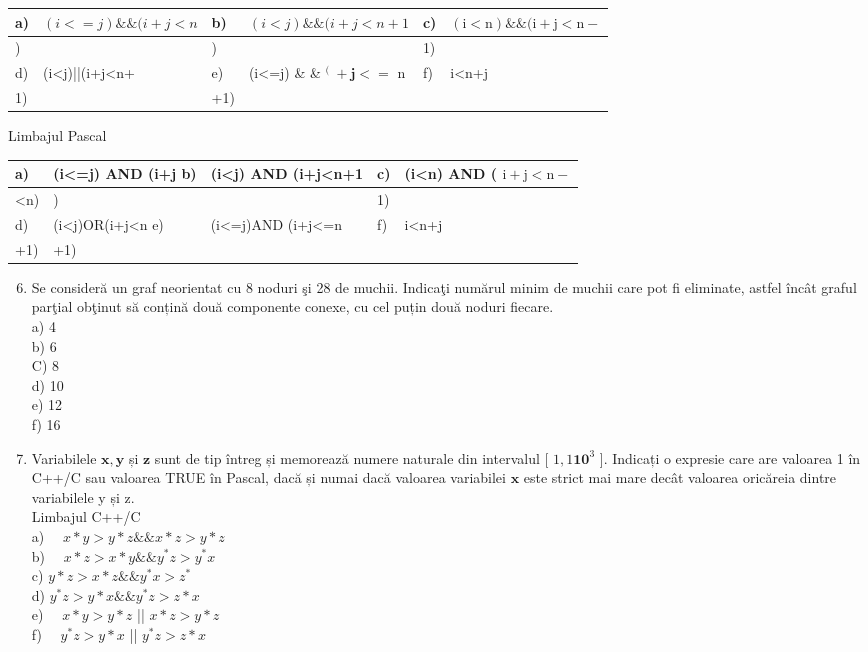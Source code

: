 \documentclass[10pt]{article}
\begin{document}
\begin{center}
\begin{tabular}{|l|l|l|l|l|l|}
\hline
a) & $(i<=j) \& \&(i+j<n$ & b) & $(i<j) \& \&(i+j<n+1$ & c) & $(\mathrm{i}<\mathrm{n}) \& \&(\mathrm{i}+\mathrm{j}<\mathrm{n}-$ \\
\hline
) &  & ) &  & 1) &  \\
\hline
d) & (i<j)||(i+j<n+ & e) & (i<=j) \& \& ${ }^{\text {( }}+\mathbf{j}<=$ n & f) & i<n+j \\
\hline
1) &  & +1) &  &  &  \\
\hline
\end{tabular}
\end{center}

Limbajul Pascal

\begin{center}
\begin{tabular}{|l|l|l|l|l|}
\hline
a) & (i<=j) AND (i+j b) & (i<j) AND (i+j<n+1 & c) & (i<n) AND ( $\mathrm{i}+\mathrm{j}<\mathrm{n}-$ \\
\hline
<n) & ) &  & 1) &  \\
\hline
d) & (i<j)OR(i+j<n e) & (i<=j)AND (i+j<=n & f) & i<n+j \\
\hline
+1) & +1) &  &  &  \\
\hline
\end{tabular}
\end{center}

\begin{enumerate}
  \setcounter{enumi}{5}
  \item Se consideră un graf neorientat cu 8 noduri şi 28 de muchii. Indicaţi numărul minim de muchii care pot fi eliminate, astfel încât graful parţial obţinut să conțină două componente conexe, cu cel puțin două noduri fiecare.\\
a) 4\\
b) 6\\
C) 8\\
d) 10\\
e) 12\\
f) 16
  \item Variabilele $\mathbf{x}, \mathbf{y}$ și $\mathbf{z}$ sunt de tip întreg și memorează numere naturale din intervalul [ $1,1 \mathbf{1 0}^{3}$ ]. Indicați o expresie care are valoarea 1 în C++/C sau valoarea TRUE în Pascal, dacă și numai dacă valoarea variabilei $\mathbf{x}$ este strict mai mare decât valoarea oricăreia dintre variabilele y și z.\\
Limbajul C++/C\\
a) $\quad x * y>y * z \& \& x * z>y * z$\\
b) $\quad x * z>x * y \& \& y^{*} z>y^{*} x$\\
c) $y * z>x * z \& \& y^{*} x>z^{*}$\\
d) $y^{*} z>y * x \& \& y^{*} z>z * x$\\
e) $\quad x * y>y * z$ || $x * z>y * z$\\
f) $\quad y^{*} z>y * x$ || $y^{*} z>z * x$
\end{enumerate}
\end{document}
